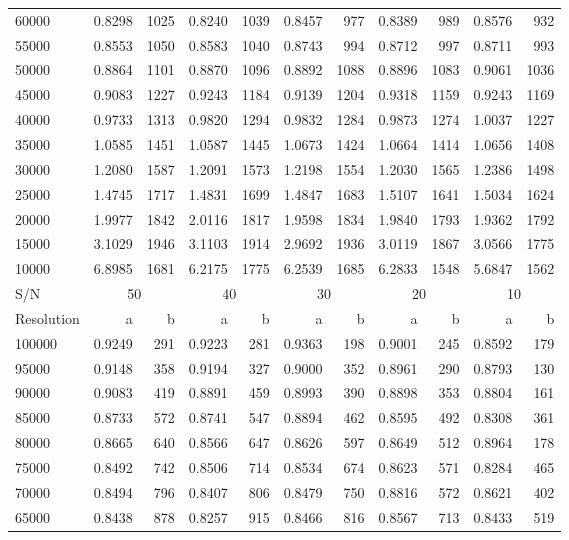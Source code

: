 \documentclass{aa}
\begin{document}
\begin{table}[]
\begin{center}
{{\begin{tabular}{l | r r | r r | r r | r r | r r}
60000 & 0.8298 & 1025 & 0.8240 & 1039 & 0.8457 & 977 & 0.8389 & 989 & 0.8576 & 932 \\
55000 & 0.8553 & 1050 & 0.8583 & 1040 & 0.8743 & 994 & 0.8712 & 997 & 0.8711 & 993 \\
50000 & 0.8864 & 1101 & 0.8870 & 1096 & 0.8892 & 1088 & 0.8896 & 1083 & 0.9061 & 1036 \\
45000 & 0.9083 & 1227 & 0.9243 & 1184 & 0.9139 & 1204 & 0.9318 & 1159 & 0.9243 & 1169 \\
40000 & 0.9733 & 1313 & 0.9820 & 1294 & 0.9832 & 1284 & 0.9873 & 1274 & 1.0037 & 1227 \\
35000 & 1.0585 & 1451 & 1.0587 & 1445 & 1.0673 & 1424 & 1.0664 & 1414 & 1.0656 & 1408 \\
30000 & 1.2080 & 1587 & 1.2091 & 1573 & 1.2198 & 1554 & 1.2030 & 1565 & 1.2386 & 1498 \\
25000 & 1.4745 & 1717 & 1.4831 & 1699 & 1.4847 & 1683 & 1.5107 & 1641 & 1.5034 & 1624 \\
20000 & 1.9977 & 1842 & 2.0116 & 1817 & 1.9598 & 1834 & 1.9840 & 1793 & 1.9362 & 1792 \\
15000 & 3.1029 & 1946 & 3.1103 & 1914 & 2.9692 & 1936 & 3.0119 & 1867 & 3.0566 & 1775 \\
10000 & 6.8985 & 1681 & 6.2175 & 1775 & 6.2539 & 1685 & 6.2833 & 1548 & 5.6847 & 1562 \\
\hline
S/N & \multicolumn{2}{c|}{50} & \multicolumn{2}{c|}{40} & \multicolumn{2}{c|}{30} & \multicolumn{2}{c|}{20} & \multicolumn{2}{c}{10} \\
Resolution & a & b & a & b & a & b & a & b & a & b  \\
\hline
100000 & 0.9249 & 291 & 0.9223 & 281 & 0.9363 & 198 & 0.9001 & 245 & 0.8592 & 179 \\
95000 & 0.9148 & 358 & 0.9194 & 327 & 0.9000 & 352 & 0.8961 & 290 & 0.8793 & 130 \\
90000 & 0.9083 & 419 & 0.8891 & 459 & 0.8993 & 390 & 0.8898 & 353 & 0.8804 & 161 \\
85000 & 0.8733 & 572 & 0.8741 & 547 & 0.8894 & 462 & 0.8595 & 492 & 0.8308 & 361 \\
80000 & 0.8665 & 640 & 0.8566 & 647 & 0.8626 & 597 & 0.8649 & 512 & 0.8964 & 178 \\
75000 & 0.8492 & 742 & 0.8506 & 714 & 0.8534 & 674 & 0.8623 & 571 & 0.8284 & 465 \\
70000 & 0.8494 & 796 & 0.8407 & 806 & 0.8479 & 750 & 0.8816 & 572 & 0.8621 & 402 \\
65000 & 0.8438 & 878 & 0.8257 & 915 & 0.8466 & 816 & 0.8567 & 713 & 0.8433 & 519 \\

\end{tabular}}}
\end{center}
\end{table}
\end{document}
